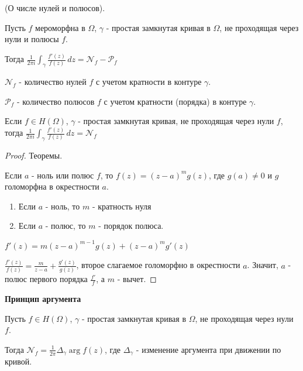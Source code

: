 \begin{theorem} (О числе нулей и полюсов).

    Пусть $f$ мероморфна в $\Omega$, $\gamma$ - простая замкнутая кривая в $\Omega$,
    не проходящая через нули и полюсы $f$.

    Тогда $\frac{1}{2 \pi i} \int_{\gamma} \frac{f'(z)}{f(z)} \, dz = \mathcal{N}_f - \mathcal{P}_f$

    $\mathcal{N}_f$ - количество нулей $f$ с учетом кратности в контуре $\gamma$.

    $\mathcal{P}_f$ - количество полюсов $f$ с учетом кратности (порядка) в контуре $\gamma$.

    \begin{consequence}
        Если $f \in H(\Omega)$, $\gamma$ - простая замкнутая кривая, не проходящая через нули $f$, тогда
        $\frac{1}{2\pi i} \int_{\gamma} \frac{f'(z)}{f(z)} \, dz = \mathcal{N}_f$
    \end{consequence}
\end{theorem}

\begin{proof} Теоремы.

    Если $a$ - ноль или полюс $f$, то $f(z) = (z - a)^m g(z)$, где $g(a) \neq 0$ и
    $g$ голоморфна в окрестности $a$.

    \begin{enumerate}
        \item Если $a$ - ноль, то $m$ - кратность нуля
        \item Если $a$ - полюс, то $m$ - порядок полюса.
    \end{enumerate}

    $f'(z) = m(z - a)^{m - 1} g(z) + (z - a)^m g'(z)$

    $\frac{f'(z)}{f(z)} = \frac{m}{z - a} + \frac{g'(z)}{g(z)}$, второе слагаемое голоморфно в окрестности $a$. Значит,
    $a$ - полюс первого порядка $\frac{f'}{f}$, а $m$ - вычет.
\end{proof}

\begin{consequence}
    \textbf{Принцип аргумента}

    Пусть $f \in H(\Omega)$, $\gamma$ - простая замкнутая кривая в $\Omega$, не проходящая через
    нули $f$.

    Тогда $\mathcal{N}_f = \frac{1}{2\pi} \Delta_{\gamma} \arg f(z)$, где $\Delta_{\gamma}$ - изменение аргумента
    при движении по кривой.
\end{consequence}

